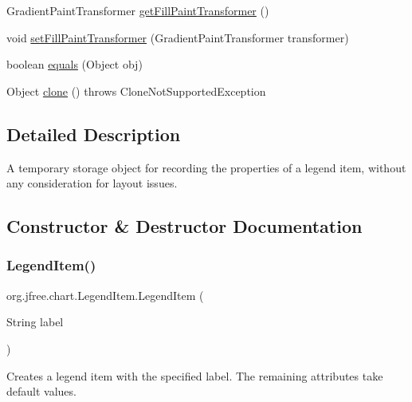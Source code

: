 \begin{DoxyCompactItemize}
\item 
Gradient\+Paint\+Transformer \mbox{\hyperlink{classorg_1_1jfree_1_1chart_1_1_legend_item_a813bf6cb2c706b32c286722575d92d40}{get\+Fill\+Paint\+Transformer}} ()
\item 
void \mbox{\hyperlink{classorg_1_1jfree_1_1chart_1_1_legend_item_a305f0ef5afe94be43e8eb6bf00a85366}{set\+Fill\+Paint\+Transformer}} (Gradient\+Paint\+Transformer transformer)
\item 
boolean \mbox{\hyperlink{classorg_1_1jfree_1_1chart_1_1_legend_item_a19816454bd9a2df69504498a048b985e}{equals}} (Object obj)
\item 
Object \mbox{\hyperlink{classorg_1_1jfree_1_1chart_1_1_legend_item_a85c4905133ec50780ae6329f09f3e576}{clone}} ()  throws Clone\+Not\+Supported\+Exception 
\end{DoxyCompactItemize}


\subsection{Detailed Description}
A temporary storage object for recording the properties of a legend item, without any consideration for layout issues. 

\subsection{Constructor \& Destructor Documentation}
\mbox{\label{classorg_1_1jfree_1_1chart_1_1_legend_item_ad7669c0c3647a5a73ac057b71b88e859}} 
\subsubsection{\texorpdfstring{Legend\+Item()}{LegendItem()}\hspace{0.1cm}{\footnotesize\ttfamily [1/10]}}
{\footnotesize\ttfamily org.\+jfree.\+chart.\+Legend\+Item.\+Legend\+Item (\begin{DoxyParamCaption}\item[{String}]{label }\end{DoxyParamCaption})}

Creates a legend item with the specified label. The remaining attributes take default values.


